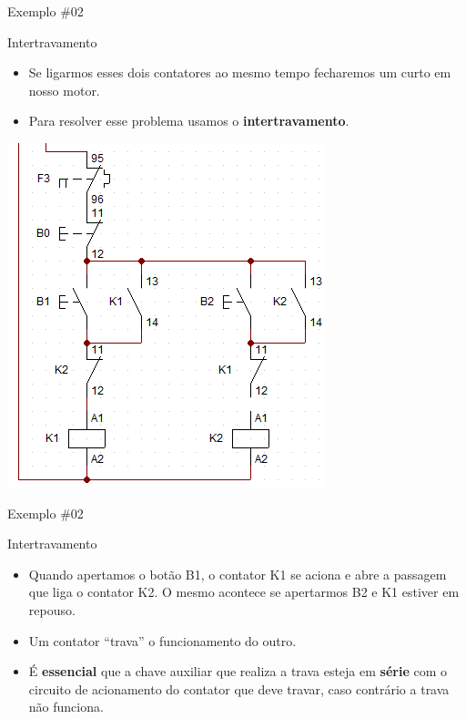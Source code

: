 \begin{frame}{Exemplo \#02}
\begin{block}{Intertravamento}
\begin{itemize}
    \item Se ligarmos esses dois contatores ao mesmo tempo fecharemos um curto em nosso motor.
    \item Para resolver esse problema usamos o \textbf{intertravamento}.
\end{itemize}
\end{block}
\centerline{\includegraphics[height=0.6\textheight]{Figuras/Ch07/fig9.jpg}}
\end{frame}

\begin{frame}{Exemplo \#02}
\begin{block}{Intertravamento}
\begin{itemize}
    \item Quando apertamos o botão B1, o contator K1 se aciona e abre a passagem que liga o contator K2. O mesmo acontece se apertarmos B2 e K1 estiver em repouso.
    \item Um contator ``trava'' o funcionamento do outro.
    \item É \textbf{essencial} que a chave auxiliar que realiza a trava esteja em \textbf{série} com o circuito de acionamento do contator que deve travar, caso contrário a trava não funciona.
\end{itemize}
\end{block}
\end{frame}


